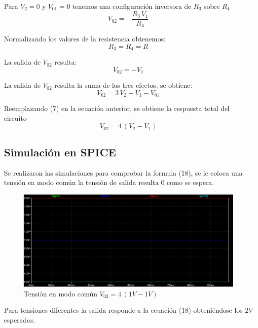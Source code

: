 \documentclass[12pt]{article}
\begin{document}
		Para $V_2=0$ y $V_{01}=0$  tenemos una configuración inversora de $R_3$ sobre $R_4$
		\begin{equation}
			V_{02}=-\frac{R_3 \,V_1 }{R_4 }
		\end{equation}
		
		Normalizando los valores de la resistencia obtenemos:
		\begin{equation}
			R_3=R_4=R 
		\end{equation}
		
		La salida de $V_{02}$ resulta:
		\begin{equation}
			V_{02}=-V_1
		\end{equation}
		
		La salida de $V_{02}$ resulta la suma de los tres efectos, se obtiene:
		\begin{equation}
			V_{02}=3\,V_2-V_1-V_{01}
		\end{equation}
		
		Reemplazando (7) en la ecuación anterior, se obtiene la respuesta total del circuito
		\begin{equation}
			V_{02}=4\,(V_2-V_1)
		\end{equation}
		
		\subsection{Simulación en SPICE}
		Se realizaron las simulaciones para comprobar la formula (18), se le coloca una tensión en modo común
		la tensión de salida resulta 0 como se espera.
		
		\begin{figure}[h]
			\centering
			\includegraphics[width=1\linewidth]{Simulaciones-Resultados/Circuito1_Vo1(Vc)-Vo2(Vc)}
			\caption{Tensión en modo común $V_{02}=4\,(1V-1V)$}
			\label{fig:circuito1vo1vc-vo2vc}
		\end{figure} 
		
		Para tensiones diferentes la salida responde a la ecuación (18) obteniéndose los $2V$ esperados. 
		
\end{document}
